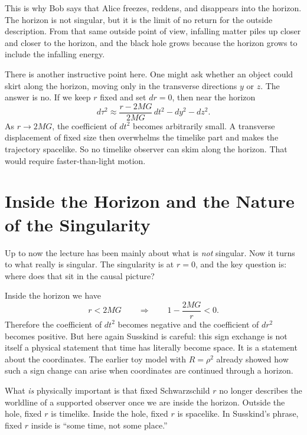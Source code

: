 This is why Bob says that Alice freezes, reddens, and disappears into the horizon. The horizon is not singular, but it is the limit of no return for the outside description. From that same outside point of view, infalling matter piles up closer and closer to the horizon, and the black hole grows because the horizon grows to include the infalling energy.

There is another instructive point here. One might ask whether an object could skirt along the horizon, moving only in the transverse directions \(y\) or \(z\). The answer is no. If we keep \(r\) fixed and set \(dr=0\), then near the horizon
\begin{equation}
d\tau^2
\approx
\frac{r-2MG}{2MG}\,dt^2
-
dy^2
-
dz^2.
\end{equation}
As \(r\to 2MG\), the coefficient of \(dt^2\) becomes arbitrarily small. A transverse displacement of fixed size then overwhelms the timelike part and makes the trajectory spacelike. So no timelike observer can skim along the horizon. That would require faster-than-light motion.

\section{Inside the Horizon and the Nature of the Singularity}

Up to now the lecture has been mainly about what is \emph{not} singular. Now it turns to what really is singular. The singularity is at \(r=0\), and the key question is: where does that sit in the causal picture?

Inside the horizon we have
\begin{equation}
r<2MG
\qquad\Longrightarrow\qquad
1-\frac{2MG}{r}<0.
\end{equation}
Therefore the coefficient of \(dt^2\) becomes negative and the coefficient of \(dr^2\) becomes positive. But here again Susskind is careful: this sign exchange is not itself a physical statement that time has literally become space. It is a statement about the coordinates. The earlier toy model with \(R=\rho^2\) already showed how such a sign change can arise when coordinates are continued through a horizon.

What \emph{is} physically important is that fixed Schwarzschild \(r\) no longer describes the worldline of a supported observer once we are inside the horizon. Outside the hole, fixed \(r\) is timelike. Inside the hole, fixed \(r\) is spacelike. In Susskind's phrase, fixed \(r\) inside is ``some time, not some place.''


